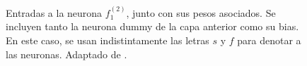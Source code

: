 \documentclass[../../main.tex]{subfiles}
\begin{document}
\begin{figure}[ht]
    \caption{Entradas a la neurona \(f^{(2)}_1\), junto con sus pesos asociados. Se
    incluyen tanto la neurona dummy de la capa anterior como su bias. En este caso, se
    usan indistintamente las letras \(s\) y \(f\) para denotar a las neuronas. Adaptado de
    \cite{tikz-neural-networks}.}
    \label{fig:neuron-weights}
\end{figure}
\end{document}
